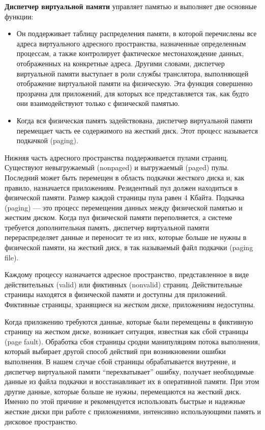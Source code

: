 \textbf{Диспетчер виртуальной памяти} управляет памятью и выполняет две основные функции:
\begin{itemize}
\item Он поддерживает таблицу распределения памяти, в которой перечислены все адреса виртуального адресного пространства, назначенные определенным процессам, а также контролирует фактическое местонахождение данных, отображенных на конкретные адреса. Другими словами, диспетчер виртуальной памяти выступает в роли службы транслятора, выполняющей отображение виртуальной памяти на физическую. Эта функция совершенно прозрачна для приложений, для которых все представляется так, как будто они взаимодействуют только с физической памятью.
\item Когда вся физическая память задействована, диспетчер виртуальной памяти перемещает часть ее содержимого на жесткий диск. Этот процесс называется подкачкой (paging).
\end{itemize}
Нижняя часть адресного пространства поддерживается пулами страниц. Существуют невыгружаемый (nonpaged) и выгружаемый (paged) пулы. Последний может быть перемещен в область подкачки жесткого диска и, как правило, назначается приложениям. Резидентный пул должен находиться в физической памяти. Размер каждой страницы пула равен 4 Кбайта.
Подкачка (paging) — это процесс перемещения данных между физической памятью и жестким диском. Когда пул физической памяти переполняется, а системе требуется дополнительная память, диспетчер виртуальной памяти перераспределяет данные и переносит те из них, которые больше не нужны в физической памяти, на жесткий диск, в так называемый файл подкачки (paging file).

Каждому процессу назначается адресное пространство, представленное в виде действительных (valid) или фиктивных (nonvalid) страниц. Действительные страницы находятся в физической памяти и доступны для приложений. Фиктивные страницы, хранящиеся на жестком диске, приложениям недоступны.

Когда приложению требуются данные, которые были перемещены в фиктивную страницу на жестком диске, возникает ситуация, известная как сбой страницы (page fault). Обработка сбоя страницы сродни манипуляциям потока выполнения, который выбирает другой способ действий при возникновении ошибки выполнения. В нашем случае сбой страницы обрабатывается внутренне, и диспетчер виртуальной памяти “перехватывает” ошибку, получает необходимые данные из файла подкачки и восстанавливает их в оперативной памяти. При этом другие данные, которые больше не нужны, перемещаются на жесткий диск. Именно по этой причине и рекомендуется использовать быстрые и надежные жесткие диски при работе с приложениями, интенсивно использующими память и дисковое пространство.

